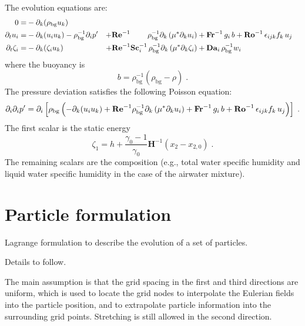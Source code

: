 The evolution equations are:
\begin{subequations}
  \begin{align}
    0                 =& -\partial_k(\rho_\mathrm{bg}u_k)   & \\
    \partial_t  u_i   =& -\partial_k ( u_i u_k )-\rho_\mathrm{bg}^{-1}\partial_i p' &
    +\mathrm{\bf Re}^{-1}\qquad\;\rho_\mathrm{bg}^{-1}\partial_k \left( \mu^{*} \partial_k u_i\right) & +\mathrm{\bf Fr}^{-1}\, g_i\,b+\mathrm{\bf Ro}^{-1}\,\epsilon_{ijk} f_k\,u_j  \\
    \partial_t\zeta_i =& -\partial_k (\zeta_i u_k) &
    + \mathrm{\bf Re}^{-1}\mathrm{\bf Sc}_i^{-1}\, \rho_\mathrm{bg}^{-1}\partial_k \left( \mu^{*}\partial_k\zeta_i\right) &+ \mathrm{\bf Da}_i\,\rho_\mathrm{bg}^{-1}w_i
  \end{align}
\end{subequations}
where the buoyancy is
\begin{equation}
  b=\rho_\mathrm{bg}^{-1}(\rho_\mathrm{bg}-\rho) \;.
\end{equation}
The pressure deviation satisfies the following Poisson equation:
\begin{equation}
  \partial_i\partial_ip'=\partial_i\left[\rho_\mathrm{bg}\left(
  -\partial_k ( u_i u_k )+\mathrm{\bf Re}^{-1}\rho_\mathrm{bg}^{-1}\partial_k \left( \mu^{*} \partial_k u_i\right) +\mathrm{\bf Fr}^{-1}\, g_i\,b+\mathrm{\bf Ro}^{-1}\,\epsilon_{ijk} f_k\,u_j
  \right)\right]\;.
\end{equation}
The first scalar is the static energy
\begin{equation}
  \zeta_1 = h + \frac{\gamma_0-1}{\gamma_0}\mathbf{H}^{-1}(x_2-x_{2,0}) \;.
\end{equation}
The remaining scalars are the composition (e.g., total water specific humidity and liquid water specific humidity in the case of the airwater mixture).

\section{Particle formulation}

Lagrange formulation to describe the evolution of a set of particles.

Details to follow.

The main assumption is that the grid spacing in the first and third directions are uniform, which is used to locate the grid nodes to interpolate the Eulerian fields into the particle position, and to extrapolate particle information into the surrounding grid points. Stretching is still allowed in the second direction.
